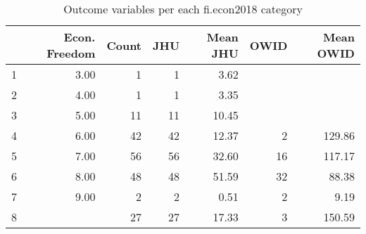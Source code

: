 \begin{table}[ht]
\centering
\caption{Outcome variables per each fi.econ2018 category} 
\begingroup\footnotesize
\begin{tabular}{rrrrrrr}
  \hline
 & Econ. Freedom & Count & JHU & Mean JHU & OWID & Mean OWID \\ 
  \hline
1 & 3.00 &   1 &   1 & 3.62 &  &  \\ 
  2 & 4.00 &   1 &   1 & 3.35 &  &  \\ 
  3 & 5.00 &  11 &  11 & 10.45 &  &  \\ 
  4 & 6.00 &  42 &  42 & 12.37 &   2 & 129.86 \\ 
  5 & 7.00 &  56 &  56 & 32.60 &  16 & 117.17 \\ 
  6 & 8.00 &  48 &  48 & 51.59 &  32 & 88.38 \\ 
  7 & 9.00 &   2 &   2 & 0.51 &   2 & 9.19 \\ 
  8 &  &  27 &  27 & 17.33 &   3 & 150.59 \\ 
   \hline
\end{tabular}
\endgroup
\end{table}
